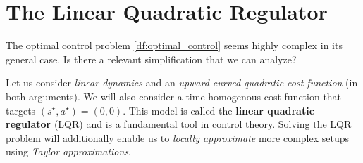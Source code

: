 \documentclass[\main/main]{subfiles}
\begin{document}
\section{The Linear Quadratic Regulator} \label{sec:lqr}

The optimal control problem \eqref{df:optimal_control} seems highly complex in its general case.
Is there a relevant simplification that we can analyze?

Let us consider \emph{linear dynamics} and an \emph{upward-curved quadratic cost function} (in both arguments). We will also consider a time-homogenous cost function that targets $(s^\star, a^\star) = (0, 0)$. This model is called the \textbf{linear quadratic regulator} (LQR) and is a fundamental tool in control theory. Solving the LQR problem will additionally enable us to \emph{locally approximate} more complex setups using \emph{Taylor approximations}.
\end{document}
